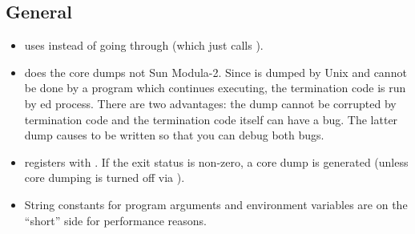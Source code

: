 \subsection{General}
\begin{itemize}
\item
     uses  instead of going through
     (which just calls ).
\item
     does the core dumps not Sun Modula-2.
    Since  is dumped by Unix and cannot be done
    by a program which continues executing, the termination code
    is run by ed process.  There are two advantages:
    the dump cannot be corrupted by termination code and
    the termination code itself can have a bug.  The latter dump
    causes  to be written so that you can debug
    both bugs.
\item
     registers with .  If the
    exit status is non-zero, a core dump is generated (unless
    core dumping is turned off via ).
\item
    String constants for program arguments and environment variables
    are on the ``short'' side for performance reasons. 
\end{itemize}

